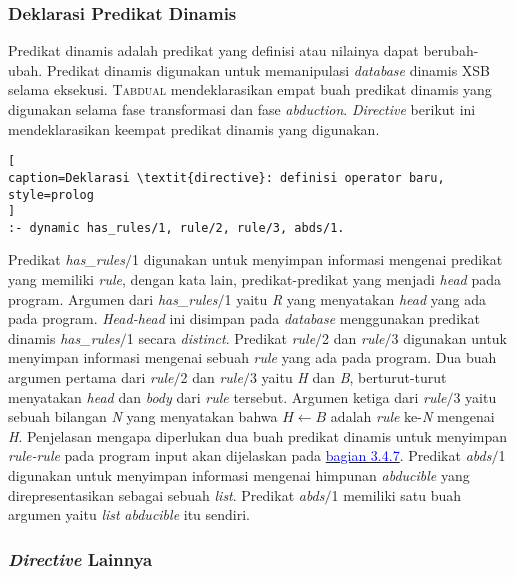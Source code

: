 \subsubsection{Deklarasi Predikat Dinamis}

Predikat dinamis adalah predikat yang definisi atau nilainya dapat berubah-ubah. Predikat dinamis digunakan untuk memanipulasi \textit{database} dinamis XSB selama eksekusi. \textsc{Tabdual} mendeklarasikan empat buah predikat dinamis yang digunakan selama fase transformasi dan fase \textit{abduction}. \textit{Directive} berikut ini mendeklarasikan keempat predikat dinamis yang digunakan. 
\\

\begin{lstlisting}[
caption=Deklarasi \textit{directive}: definisi operator baru,
style=prolog
]
:- dynamic has_rules/1, rule/2, rule/3, abds/1.
\end{lstlisting}

Predikat \textit{has\_rules$/$}1 digunakan untuk menyimpan informasi mengenai predikat yang memiliki \textit{rule}, dengan kata lain, predikat-predikat yang menjadi \textit{head} pada program. Argumen dari \textit{has\_rules$/$}1 yaitu \textit{R} yang menyatakan \textit{head} yang ada pada program. \textit{Head-head} ini disimpan pada \textit{database} menggunakan predikat dinamis \textit{has\_rules$/$}1 secara \textit{distinct}. Predikat \textit{rule$/$}2 dan \textit{rule$/$}3 digunakan untuk menyimpan informasi mengenai sebuah \textit{rule} yang ada pada program. Dua buah argumen pertama dari \textit{rule$/$}2 dan \textit{rule$/$}3 yaitu \textit{H} dan \textit{B}, berturut-turut menyatakan \textit{head} dan \textit{body} dari \textit{rule} tersebut. Argumen ketiga dari \textit{rule$/$}3 yaitu sebuah bilangan \textit{N} yang menyatakan bahwa \textit{$H \leftarrow B$} adalah \textit{rule} ke-\textit{N} mengenai \textit{H}.\label{rule2to3} Penjelasan mengapa diperlukan dua buah predikat dinamis untuk menyimpan \textit{rule-rule} pada program input akan dijelaskan pada \hyperref[subsec:add_indices]{\textcolor{blue}{bagian 3.4.7}}. Predikat \textit{abds$/$}1 digunakan untuk menyimpan informasi mengenai himpunan \textit{abducible} yang direpresentasikan sebagai sebuah \textit{list}. Predikat \textit{abds$/$}1 memiliki satu buah argumen yaitu \textit{list} \textit{abducible} itu sendiri.

\subsubsection{\textit{Directive} Lainnya}

